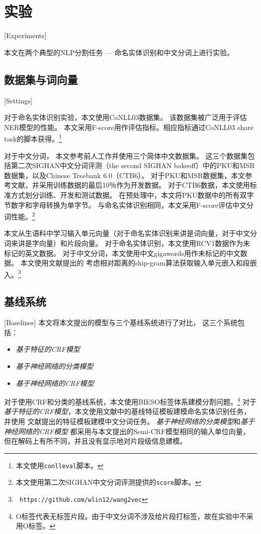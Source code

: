 \section{实验}[Experiments]

本文在两个典型的NLP分割任务 --- 命名实体识别和中文分词上进行实验。

\subsection{数据集与词向量}[Settings]

对于命名实体识别实验，本文使用CoNLL03数据集。
该数据集被广泛用于评估NER模型的性能。
本文采用F-score用作评估指标。相应指标通过CoNLL03 share task的脚本获得。\footnote{本文使用\texttt{conlleval}脚本。}

对于中文分词，
本文参考前人工作并使用三个简体中文数据集。
这三个数据集包括第二次SIGHAN中文分词评测（the second SIGHAN bakeoff）中的PKU和MSR数据集，以及Chinese Treebank 6.0（CT​​B6）。
对于PKU和MSR数据集，本文参考文献，并采用训练数据的最后10％作为开发数据。
对于CTB6数据，本文使用标准方式划分训练、开发和测试数据。
在预处理中，本文将PKU数据中的所有双字节数字和字母转换为单字节。
与命名实体识别相同，本文采用F-score评估中文分词性能。\footnote{本文使用第二次SIGHAN中文分词评测提供的\texttt{score}脚本。}

本文从生语料中学习输入单元向量（对于命名实体识别来讲是词向量，对于中文分词来讲是字向量）和片段向量。
对于命名实体识别，本文使用RCV1数据作为未标记的英文数据。
对于中文分词，本文使用中文gigawords用作未标记的中文数据。
本文使用文献提出的
考虑相对距离的skip-gram算法获取输入单元嵌入和段嵌入。\footnote{\texttt{ https://github.com/wlin12/wang2vec}}

\subsection{基线系统}[Baselines]
本文将本文提出的模型与三个基线系统进行了对比，
这三个系统包括：
\begin{itemize}
	\item \textit{基于特征的CRF模型}
	\item \textit{基于神经网络的分类模型}
	\item \textit{基于神经网络的CRF模型}
\end{itemize}

对于使用CRF和分类的基线系统，本文使用BIESO标签体系建模分割问题。\footnote {O标签代表无标签片段。由于中文分词不涉及给片段打标签，故在实验中不采用O标签。}
对于\textit{基于特征的CRF模型}，本文使用文献中的基线特征模板建模命名实体识别任务，并使用
文献提出的特征模板建模中文分词任务。
\textit{基于神经网络的分类模型}和\textit{基于神经网络的CRF模型}
都采用与本文提出的Semi-CRF模型相同的输入单位向量，
但在解码上有所不同，并且没有显示地对片段级信息建模。


